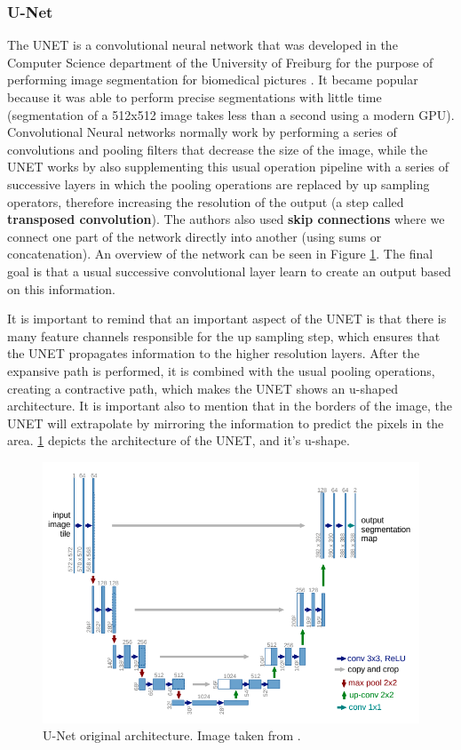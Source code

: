 \subsubsection{U-Net}

The UNET is a convolutional neural network that was developed in the Computer Science department of the University of Freiburg for the purpose of performing image segmentation for
biomedical pictures \cite{Unet}. It became popular because it was able to perform precise segmentations with little time (segmentation of a 512x512 image takes less than a second using a modern GPU).
Convolutional Neural networks normally work by performing a series of convolutions and pooling filters that decrease the size of the image, while the UNET works by also 
supplementing this usual operation pipeline with a series of successive layers in which the pooling operations are replaced by up sampling operators, therefore increasing the resolution of the output (a step called \textbf{transposed convolution}).
The authors also used \textbf{skip connections} where we connect one part of the network directly into another (using sums or concatenation). An overview of the network can be seen in Figure \ref{unetimg}.
The final goal is that a usual successive convolutional layer learn to create an output based on this information. 

It is important to remind that an important aspect of the UNET is that there is many feature channels responsible for the up sampling step, which ensures that the UNET propagates information
to the higher resolution layers. After the expansive path is performed, it is combined with the usual pooling operations, creating a contractive path, which makes the UNET shows an u-shaped architecture. 
It is important also to mention that in the borders of the image, the UNET will extrapolate by mirroring the information to predict the pixels in the area. 
\ref{unetimg} depicts the architecture of the UNET, and it's u-shape.

\begin{figure}[H]
    \includegraphics[width=.9\textwidth]{Cap2-Methods/screenshot_1.png}
    \centering
	\caption{U-Net original architecture. Image taken from \cite{unet_gordo}.}
	\label{unetimg}
\end{figure}

